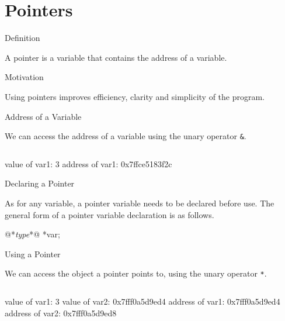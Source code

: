 \documentclass[compress]{beamer}
\begin{document}
\prepareCover

\section{Pointers}

\begin{slide}
	\begin{block}{Definition}

	A pointer is a variable that contains the address of a variable.

	\end{block}
	\begin{block}{Motivation}

	Using pointers improves efficiency, clarity and simplicity of the program.

	\end{block}
\end{slide}

\begin{slide}
	\begin{block}{Address of a Variable}

	We can access the address of a variable using the unary operator \alert{\texttt{\&}}.

	\inputminted[fontsize=\footnotesize, firstline=14, lastline=16, linenos]{c}{
		\resDirectory/ls10-point1.c
	}
	\begin{terminal}
	value of var1: 3
	address of var1: 0x7ffce5183f2c
	\end{terminal}

	\end{block}
\end{slide}

\begin{slide}
	\begin{block}{Declaring a Pointer}

	As for any variable, a pointer variable needs to be declared before use.
	The general form of a pointer variable declaration is as follows.

	\begin{terminal}
	@*\textit{type}*@ *var;
	\end{terminal}

	\end{block}
\end{slide}

\begin{slide}
	\begin{block}{Using a Pointer}

	We can access the object a pointer points to, using the unary operator \alert{\texttt{*}}.

	\inputminted[fontsize=\footnotesize, firstline=14, lastline=16, linenos]{c}{
		\resDirectory/ls10-point2.c
	}

	\begin{terminal}
	value of  var1: 3
	value of  var2: 0x7fff0a5d9ed4
	address of var1: 0x7fff0a5d9ed4
	address of var2: 0x7fff0a5d9ed8
	\end{terminal}

	\end{block}
\end{slide}
\end{document}

